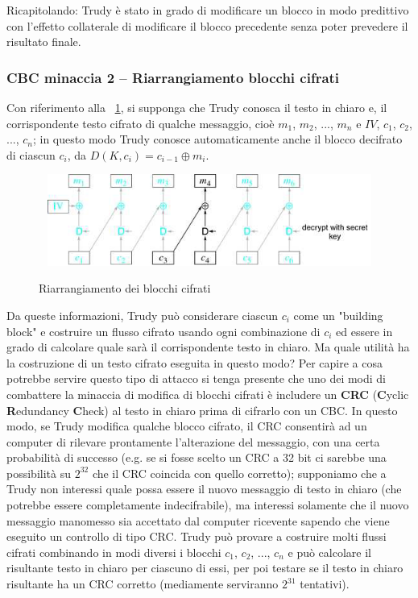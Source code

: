 \newline \newline
Ricapitolando: Trudy è stato in grado di modificare un blocco in modo predittivo con l'effetto collaterale di modificare il blocco precedente senza poter prevedere il risultato finale.
\subsubsection{CBC minaccia 2 – Riarrangiamento blocchi cifrati}
Con riferimento alla \figurename~\ref{fig:riarrangiamento_blk_cifrati}, si supponga che Trudy conosca il testo in chiaro e, il corrispondente testo cifrato di qualche messaggio, cioè $m_{1}$, $m_{2}$, ..., $m_{n}$ e $IV$, $c_{1}$, $c_{2}$, ..., $c_{n}$; in questo modo Trudy conosce automaticamente anche il blocco decifrato di ciascun $c_{i}$, da $D(K, c_{i}) = c_{i-1} \oplus m_{i}$.
\begin{figure}[htbp]
	\centering%
	\subfigure%
	{\includegraphics[height=3cm, width=12cm, keepaspectratio]{Immagini/modalita_operative/riarrangiamento_blk_cifrati.png}}
	\caption{Riarrangiamento dei blocchi cifrati \label{fig:riarrangiamento_blk_cifrati}}	
\end{figure}
Da queste informazioni, Trudy può considerare ciascun $c_{i}$ come un "building block" e costruire un flusso cifrato usando ogni combinazione di $c_{i}$ ed essere in grado di calcolare quale sarà il corrispondente testo in chiaro. \newline \newline
Ma quale utilità ha la costruzione di un testo cifrato eseguita in questo modo? Per capire a cosa potrebbe servire questo tipo di attacco si tenga presente che uno dei modi di combattere la minaccia di modifica di blocchi cifrati è includere un \textbf{CRC} (\textbf{C}yclic \textbf{R}edundancy \textbf{C}heck) al testo in chiaro prima di cifrarlo con un CBC. In questo modo, se Trudy modifica qualche blocco cifrato, il CRC consentirà ad un computer di rilevare prontamente l'alterazione del messaggio, con una certa probabilità di successo (e.g. se si fosse scelto un CRC a 32 bit ci sarebbe una possibilità su $2^{32}$ che il CRC coincida con quello corretto); supponiamo che a Trudy non interessi quale possa essere il nuovo messaggio di testo in chiaro (che potrebbe essere completamente indecifrabile), ma interessi solamente che il nuovo messaggio manomesso sia accettato dal computer ricevente sapendo che viene eseguito un controllo di tipo CRC. Trudy può provare a costruire molti flussi cifrati combinando in modi diversi i blocchi $c_{1}$, $c_{2}$, ..., $c_{n}$ e può calcolare il risultante testo in chiaro per ciascuno di essi, per poi testare se il testo in chiaro risultante ha un CRC corretto (mediamente serviranno $2^{31}$ tentativi).
